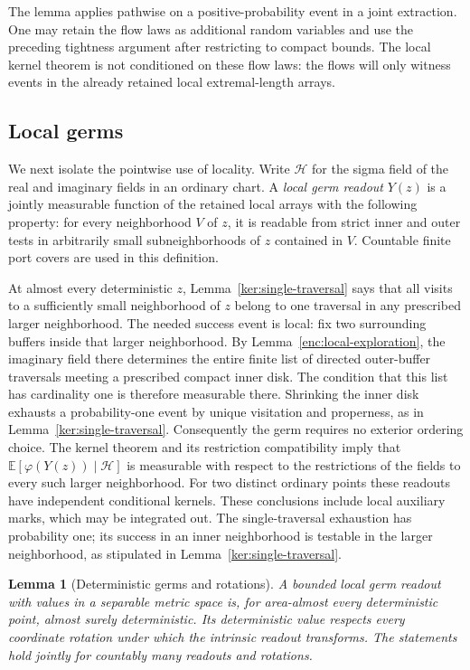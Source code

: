 \documentclass[11pt]{article}
\numberwithin{equation}{section}
\newtheorem{lemma}[theorem]{Lemma}
\theoremstyle{definition}
\theoremstyle{remark}
\newcommand{\EE}{\mathbb E}
\newcommand{\1}{\mathbf 1}
\begin{document}
The lemma applies pathwise on a positive-probability event in a joint
extraction.  One may retain the flow laws as additional random
variables and use the preceding tightness argument after restricting
to compact bounds.  The local kernel theorem is not conditioned on
these flow laws: the flows will only witness events in the already
retained local extremal-length arrays.

\subsection{Local germs}
\label{conf:germ-subsection}

We next isolate the pointwise use of locality.  Write
\(\mathcal H\) for the sigma field of the real and imaginary fields
in an ordinary chart.  A \emph{local germ readout} \(Y(z)\) is a
jointly measurable function of the retained local arrays with the
following property: for every neighborhood \(V\) of \(z\), it is
readable from strict inner and outer tests in arbitrarily small
subneighborhoods of \(z\) contained in \(V\).  Countable finite
port covers are used in this definition.

At almost every deterministic \(z\), Lemma~\ref{ker:single-traversal}
says that all visits to a sufficiently small neighborhood of \(z\)
belong to one traversal in any prescribed larger neighborhood.
The needed success event is local: fix two surrounding buffers inside
that larger neighborhood. By Lemma~\ref{enc:local-exploration}, the
imaginary field there determines the entire finite list of directed
outer-buffer traversals meeting a prescribed compact inner disk. The
condition that this list has cardinality one is therefore measurable
there. Shrinking the inner disk exhausts a probability-one event by
unique visitation and properness, as in Lemma~\ref{ker:single-traversal}.
Consequently the germ requires no exterior ordering choice. The
kernel theorem and its restriction compatibility imply that
\(\EE[\varphi(Y(z))\mid\mathcal H]\) is measurable with respect
to the restrictions of the fields to every such larger neighborhood.
For two distinct ordinary points these readouts have independent
conditional kernels.  These conclusions include local auxiliary marks,
which may be integrated out.  The single-traversal exhaustion has
probability one; its success in an inner neighborhood is testable in
the larger neighborhood, as stipulated in
Lemma~\ref{ker:single-traversal}.

\begin{lemma}[Deterministic germs and rotations]
\label{conf:germs}
A bounded local germ readout with values in a separable metric space
is, for area-almost every deterministic point, almost surely
deterministic.  Its deterministic value respects every coordinate
rotation under which the intrinsic readout transforms.  The statements
hold jointly for countably many readouts and rotations.
\end{lemma}
\end{document}

